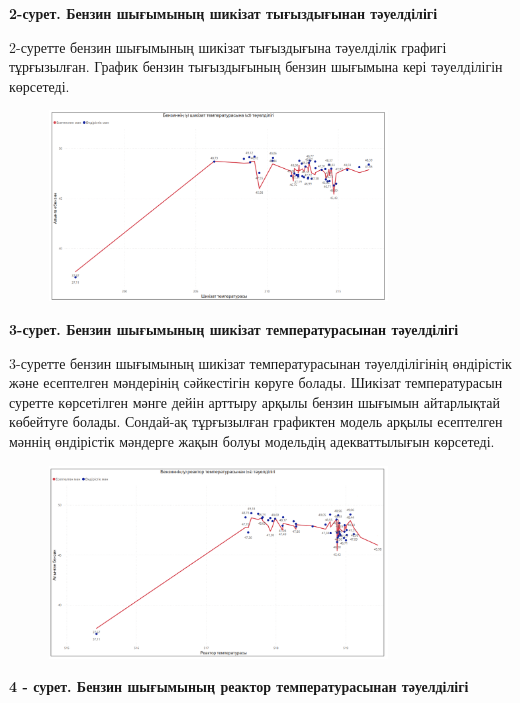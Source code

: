 {\bfseries 2-сурет. Бензин шығымының шикізат тығыздығынан тәуелділігі}

2-суретте бензин шығымының шикізат тығыздығына тәуелділік графигі
тұрғызылған. График бензин тығыздығының бензин шығымына кері
тәуелділігін көрсетеді.

\begin{figure}[H]
	\centering
	\includegraphics[width=0.8\textwidth]{media/ict/image96}
	\caption*{}
\end{figure}


{\bfseries 3-сурет. Бензин шығымының шикізат температурасынан тәуелділігі}

3-суретте бензин шығымының шикізат температурасынан тәуелділігінің
өндірістік және есептелген мәндерінің сәйкестігін көруге болады. Шикізат
температурасын суретте көрсетілген мәнге дейін арттыру арқылы бензин
шығымын айтарлықтай көбейтуге болады. Сондай-ақ тұрғызылған графиктен
модель арқылы есептелген мәннің өндірістік мәндерге жақын болуы
модельдің адекваттылығын көрсетеді.

\begin{figure}[H]
	\centering
	\includegraphics[width=0.8\textwidth]{media/ict/image97}
	\caption*{}
\end{figure}


{\bfseries 4 - сурет. Бензин шығымының реактор температурасынан
тәуелділігі}

